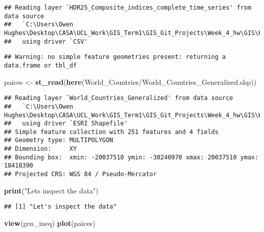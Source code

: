 \documentclass[
]{article}
\newenvironment{Shaded}{\begin{snugshade}}{\end{snugshade}}
\newcommand{\FunctionTok}[1]{\textcolor[rgb]{0.13,0.29,0.53}{\textbf{#1}}}
\newcommand{\NormalTok}[1]{#1}
\newcommand{\OtherTok}[1]{\textcolor[rgb]{0.56,0.35,0.01}{#1}}
\newcommand{\StringTok}[1]{\textcolor[rgb]{0.31,0.60,0.02}{#1}}
\begin{document}
\begin{verbatim}
## Reading layer `HDR25_Composite_indices_complete_time_series' from data source 
##   `C:\Users\Owen Hughes\Desktop\CASA\UCL_Work\GIS_Term1\GIS_Git_Projects\Week_4_hw\GIS\HDR25_Composite_indices_complete_time_series.csv' 
##   using driver `CSV'
\end{verbatim}

\begin{verbatim}
## Warning: no simple feature geometries present: returning a data.frame or tbl_df
\end{verbatim}

\begin{Shaded}
\begin{Highlighting}[]
\NormalTok{paices }\OtherTok{\textless{}{-}} \FunctionTok{st\_read}\NormalTok{(}\FunctionTok{here}\NormalTok{(}\StringTok{\textquotesingle{}World\_Countries/World\_Countries\_Generalized.shp\textquotesingle{}}\NormalTok{))}
\end{Highlighting}
\end{Shaded}

\begin{verbatim}
## Reading layer `World_Countries_Generalized' from data source 
##   `C:\Users\Owen Hughes\Desktop\CASA\UCL_Work\GIS_Term1\GIS_Git_Projects\Week_4_hw\GIS\World_Countries\World_Countries_Generalized.shp' 
##   using driver `ESRI Shapefile'
## Simple feature collection with 251 features and 4 fields
## Geometry type: MULTIPOLYGON
## Dimension:     XY
## Bounding box:  xmin: -20037510 ymin: -30240970 xmax: 20037510 ymax: 18418390
## Projected CRS: WGS 84 / Pseudo-Mercator
\end{verbatim}

\begin{Shaded}
\begin{Highlighting}[]
\FunctionTok{print}\NormalTok{(}\StringTok{"Let\textquotesingle{}s inspect the data"}\NormalTok{)}
\end{Highlighting}
\end{Shaded}

\begin{verbatim}
## [1] "Let's inspect the data"
\end{verbatim}

\begin{Shaded}
\begin{Highlighting}[]
\FunctionTok{view}\NormalTok{(gen\_ineq)}
\FunctionTok{plot}\NormalTok{(paices)}
\end{Highlighting}
\end{Shaded}
\end{document}
